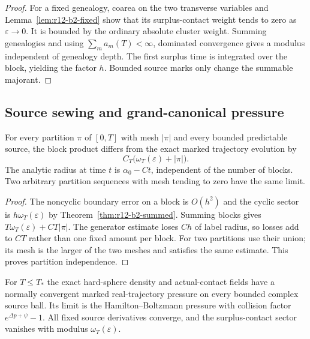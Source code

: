 \begin{proof}
For a fixed genealogy, coarea on the two transverse variables and
Lemma~\ref{lem:r12-b2-fixed} show that its surplus-contact weight tends to zero
as $\varepsilon\to0$.  It is bounded by the ordinary absolute cluster weight.
Summing genealogies and using $\sum_m a_m(T)<\infty$, dominated convergence
gives a modulus independent of genealogy depth.  The first surplus time is
integrated over the block, yielding the factor $h$.  Bounded source marks only
change the summable majorant.
\end{proof}

\subsection{Source sewing and grand-canonical pressure}

\begin{theorem}
\label{thm:r12-b2-sewing}
For every partition $\pi$ of $[0,T]$ with mesh $|\pi|$ and every bounded
predictable source, the block product differs from the exact marked
trajectory evolution by
\[
 C_T\bigl(\omega_T(\varepsilon)+|\pi|\bigr).
\]
The analytic radius at time $t$ is $\alpha_0-Ct$, independent of the number of
blocks.  Two arbitrary partition sequences with mesh tending to zero have the
same limit.
\end{theorem}

\begin{proof}
The noncyclic boundary error on a block is $O(h^2)$ and the cyclic sector is
$h\omega_T(\varepsilon)$ by Theorem~\ref{thm:r12-b2-summed}.  Summing blocks
gives $T\omega_T(\varepsilon)+CT|\pi|$.  The generator estimate loses $Ch$ of
label radius, so losses add to $CT$ rather than one fixed amount per block.
For two partitions use their union; its mesh is the larger of the two meshes
and satisfies the same estimate.  This proves partition independence.
\end{proof}

\begin{theorem}
\label{thm:r12-b2-gc}
For $T\le T_*$ the exact hard-sphere density and actual-contact fields have a
normally convergent marked real-trajectory pressure on every bounded complex
source ball.  Its limit is the Hamilton--Boltzmann pressure with collision
factor $e^{\Delta p+\psi}-1$.  All fixed source derivatives converge, and the
surplus-contact sector vanishes with modulus $\omega_T(\varepsilon)$.
\end{theorem}

